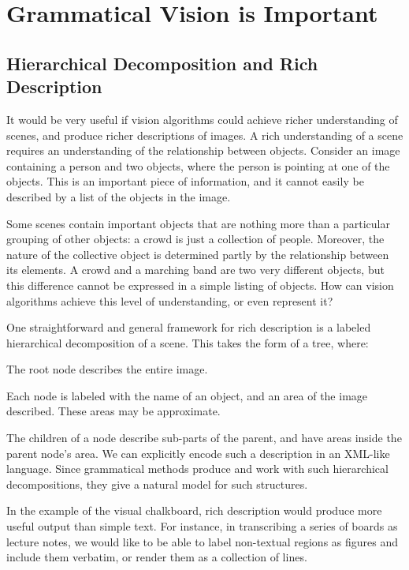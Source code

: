 \documentclass{article}
\begin{document}
\section{Grammatical Vision is Important}

\subsection{Hierarchical Decomposition and Rich Description}
\label{sec-annotation}

It would be very useful if vision algorithms could achieve richer
understanding of scenes, and produce richer descriptions of images. A
rich understanding of a scene requires an understanding of the
relationship between objects. Consider an image containing a person
and two objects, where the person is pointing at one of the
objects. This is an important piece of information, and it cannot
easily be described by a list of the objects in the image.

Some scenes contain important objects that are nothing more than a
particular grouping of other objects: a crowd is just a collection of
people. Moreover, the nature of the collective object is determined
partly by the relationship between its elements. A crowd and a
marching band are two very different objects, but this difference
cannot be expressed in a simple listing of objects. How can vision
algorithms achieve this level of understanding, or even represent it?

One straightforward and general framework for rich description is a
labeled hierarchical decomposition of a
scene. \cite{zhu-mumford} This takes the form of a tree, where:
\bitem
\item The root node describes the entire image.
\item Each node is labeled with the name of an object, and an area of the image described. These areas may be approximate.
\item The children of a node describe sub-parts of the parent, and
  have areas inside the parent node's area.
\eitem
We can explicitly encode such a description in an XML-like language.
Since grammatical methods produce and work with such hierarchical
decompositions, they give a natural model for such structures.

In the example of the visual chalkboard, rich description would
produce more useful output than simple text. For instance, in
transcribing a series of boards as lecture notes, we would like to be
able to label non-textual regions as figures and include them
verbatim, or render them as a collection of lines.
\end{document}
